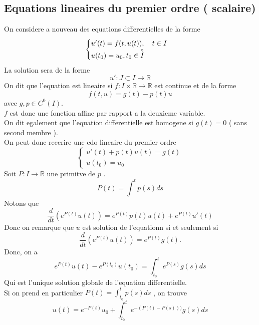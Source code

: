 \documentclass[../main.tex]{subfiles}
\begin{document}
\subsection{Equations lineaires du premier ordre ( scalaire) }
On considere a nouveau des equations differentielles de la forme
\[ 
	\begin{cases}
	u'( t) = f( t,u( t) ) , \quad t \in I \\
	u( t_0) = u_0, t_0 \in \overset{\circ}{I}
	\end{cases}
\]
La solution sera de la forme
\[ 
u': J \subset I \to \mathbb{R}
\]
On dit que l'equation est lineaire si $f: I \times  \mathbb{R} \to \mathbb{R}$ est continue et de la forme
\[ 
	f( t,u) = g( t) - p( t) u
\]
avec $g,p \in C^{0}( I) $.\\
$f$ est donc une fonction affine par rapport a la deuxieme variable.\\
On dit egalement que l'equation differentielle est homogene si $g( t) =0$ ( sans second membre ).\\
On peut donc reecrire une edo lineaire du premier ordre
\[ 
\begin{cases}
	u'( t) + p( t) u( t) = g( t) \\
	u( t_0) = u_0
\end{cases}
\]
Soit $P: I \to \mathbb{R}$ une primitve de $p$ .
\[ 
	P( t) = \int_{  }^{ t }p( s) ds
\]
Notons que
\[ 
	\frac{d}{dt}\left( e^{P( t) } u( t) \right) = e^{P( t) } p( t) u( t) + e^{P( t)} u'( t) 
\]
Donc on remarque que $u$ est solution de l'equationn si et seulement si
\[ 
	\frac{d}{dt}\left( e^{P( t) } u( t)  \right) = e^{P( t) } g( t) .
\]
Donc, on a 
\[ 
	e^{P( t) } u( t) - e^{P( t_0) } u( t_0) = \int_{ t_0 }^{ t } e^{P( s) } g( s) ds
\]
Qui est l'unique solution globale de l'equation differentielle.\\
Si on prend en particulier $P( t) = \int_{ t_0 }^{ t }p( s) ds$ , on trouve
\[ 
	u( t) = e^{-P( t) } u_0 + \int_{ t_0 }^{ t } e^{- ( P( t) - P( s) ) ) } g( s) ds
\]
\end{document}
